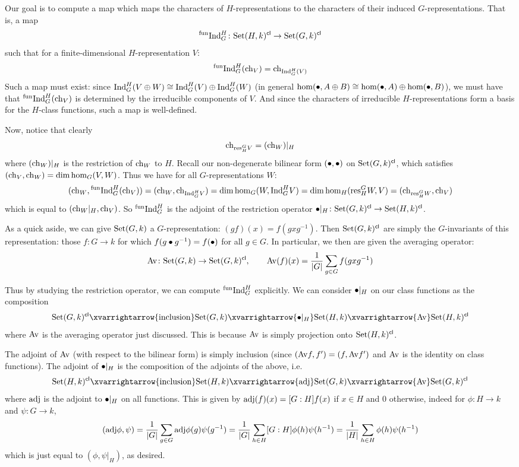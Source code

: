 Our goal is to compute a map which maps the characters of $H$-representations to the characters of their induced $G$-representations.
That is, a map
$$ {}^{\rm fun}{\rm Ind}^H_G\colon{\rm Set}(H,k)^{\sf cl}\to{\rm Set}(G,k)^{\sf cl} $$
such that for a finite-dimensional $H$-representation $V$:
$$ {}^{\rm fun}{\rm Ind}^H_G({\rm ch}_V) = {\rm ch}_{{\rm Ind}^H_G(V)} $$
Such a map must exist: since ${\rm Ind}^H_G(V\oplus W)\cong{\rm Ind}^H_G(V)\oplus{\rm Ind}^H_G(W)$ (in general $\hom(\bullet,A\oplus B)\cong\hom(\bullet,A)\oplus\hom(\bullet,B)$), we must have that
${}^{\rm fun}{\rm Ind}^H_G({\rm ch}_V)$ is determined by the irreducible components of $V$.
And since the characters of irreducible $H$-representations form a basis for the $H$-class functions, such a map is well-defined.

Now, notice that clearly
$$ {\rm ch}_{{\rm res}^G_HV} = ({\rm ch}_W)|_H $$
where $({\rm ch}_W)|_H$ is the restriction of ${\rm ch}_W$ to $H$.
Recall our non-degenerate bilinear form $(\bullet,\bullet)$ on ${\rm Set}(G,k)^{\sf cl}$, which satisfies $({\rm ch}_V,{\rm ch}_W)=\dim\hom_G(V,W)$.
Thus we have for all $G$-representations $W$:
$$ ({\rm ch}_W,{}^{\rm fun}{\rm Ind}^H_G({\rm ch}_V)) = ({\rm ch}_W,{\rm ch}_{{\rm Ind}^H_G V}) = \dim\hom_G(W,{\rm Ind}^H_GV) = \dim\hom_H({\rm res}^G_HW,V) = ({\rm ch}_{{\rm res}^G_HW},{\rm ch}_V) $$
which is equal to $({\rm ch}_W|_H,{\rm ch}_V)$.
So ${}^{\rm fun}{\rm Ind}^H_G$ is the adjoint of the restriction operator $\bullet|_H\colon{\rm Set}(G,k)^{\sf cl}\to{\rm Set}(H,k)^{\sf cl}$.

As a quick aside, we can give ${\rm Set}(G,k)$ a $G$-representation: $(gf)(x)=f(gxg^{-1})$.
Then ${\rm Set}(G,k)^{\sf cl}$ are simply the $G$-invariants of this representation: those $f\colon G\to k$ for which $f(g\bullet g^{-1})=f(\bullet)$ for all $g\in G$.
In particular, we then are given the averaging operator:
$$ {\rm Av}\colon{\rm Set}(G,k) \to {\rm Set}(G,k)^{\sf cl},\qquad {\rm Av}(f)(x) = {{1}\over{\mathopen{}\mathclose{\left|G\right|}}}\sum_{g\in G}f(gxg^{-1}) $$

Thus by studying the restriction operator, we can compute ${}^{\rm fun}{\rm Ind}^H_G$ explicitly.
We can consider $\bullet|_H$ on our class functions as the composition
$$ \St(G,k)^\cl \xvarrightarrow{\rm inclusion} \St(G,k) \xvarrightarrow{\bul|_H} \St(H,k) \xvarrightarrow{\av} \St(H,k)^\cl $$
where ${\rm Av}$ is the averaging operator just discussed.
This is because ${\rm Av}$ is simply projection onto ${\rm Set}(H,k)^{\sf cl}$.

The adjoint of ${\rm Av}$ (with respect to the bilinear form) is simply inclusion (since $({\rm Av} f,f')=(f,{\rm Av} f')$ and ${\rm Av}$ is the identity on class functions).
The adjoint of $\bullet|_H$ is the composition of the adjoints of the above, i.e.\
$$ \St(H,k)^\cl \xvarrightarrow{\rm inclusion} \St(H,k) \xvarrightarrow{\rm adj} \St(G,k) \xvarrightarrow{\av} \St(G,k)^\cl $$
where ${\rm adj}$ is the adjoint to $\bullet|_H$ on all functions.
This is given by ${\rm adj}(f)(x)=[G:H]f(x)$ if $x\in H$ and $0$ otherwise, indeed for $\phi\colon H\to k$ and $\psi\colon G\to k$,
$$ ({\rm adj}\phi,\psi) = {{1}\over{\mathopen{}\mathclose{\left|G\right|}}}\sum_{g\in G}{\rm adj}\phi(g)\psi(g^{-1}) = {{1}\over{\mathopen{}\mathclose{\left|G\right|}}}\sum_{h\in H}[G:H]\phi(h)\psi(h^{-1}) = {{1}\over{\mathopen{}\mathclose{\left|H\right|}}}\sum_{h\in H}\phi(h)\psi(h^{-1}) $$
which is just equal to $(\phi,\psi|_H)$, as desired.

